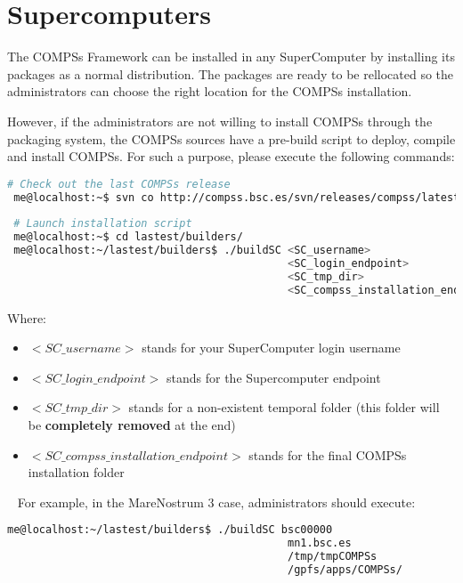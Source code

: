 \section{Supercomputers}
\label{sec:Supercomputers}

The COMPSs Framework can be installed in any SuperComputer by installing its packages as a normal distribution. The packages are
ready to be rellocated so the administrators can choose the right location for the COMPSs installation. \newline

However, if the administrators are not willing to install COMPSs through the packaging system, the COMPSs sources have a pre-build
script to deploy, compile and install COMPSs. For such a purpose, please execute the following commands:
\begin{lstlisting}[language=bash]
 # Check out the last COMPSs release
 me@localhost:~$ svn co http://compss.bsc.es/svn/releases/compss/latest/
 
 # Launch installation script
 me@localhost:~$ cd lastest/builders/
 me@localhost:~/lastest/builders$ ./buildSC <SC_username> 
                                            <SC_login_endpoint> 
                                            <SC_tmp_dir> 
                                            <SC_compss_installation_endpoint>
\end{lstlisting}

Where:
\begin{itemize}
 \item $<SC\_username>$ stands for your SuperComputer login username
 \item $<SC\_login\_endpoint>$ stands for the Supercomputer endpoint
 \item $<SC\_tmp\_dir>$ stands for a non-existent temporal folder (this folder will be \textbf{completely removed} at the end)
 \item $<SC\_compss\_installation\_endpoint>$ stands for the final COMPSs installation folder
\end{itemize}

~ \newline
For example, in the MareNostrum 3 case, administrators should execute:
\begin{lstlisting}[language=bash]
 me@localhost:~/lastest/builders$ ./buildSC bsc00000 
                                            mn1.bsc.es 
                                            /tmp/tmpCOMPSs 
                                            /gpfs/apps/COMPSs/
\end{lstlisting}

